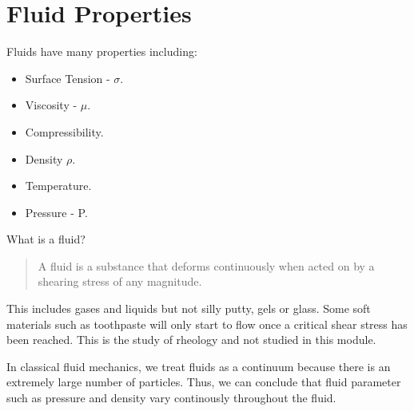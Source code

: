 \documentclass[class=report, crop=false, 12pt,a4paper]{standalone}
\begin{document}
\section{Fluid Properties}
Fluids have many properties including:

\begin{multicols}{2}
  \begin{itemize}[noitemsep]
    \item Surface Tension - \( \sigma \).
    \item Viscosity - \( \mu \).
    \item Compressibility.
    \item Density \( \rho \).
    \item Temperature.
    \item Pressure - P.
  \end{itemize}
\end{multicols}

What is a fluid?
\begin{quote}
  \begin{center}
    A fluid is a substance that deforms continuously when acted on by a shearing stress of any magnitude. 
  \end{center}
\end{quote}
This includes gases and liquids but not silly putty, gels or glass. Some soft materials such as toothpaste will only start to flow once a critical shear stress has been reached. This is the study of rheology and not studied in this module.

In classical fluid mechanics, we treat fluids as a continuum because there is an extremely large number of particles. Thus, we can conclude that fluid parameter such as pressure and density vary continously throughout the fluid.
\end{document}
